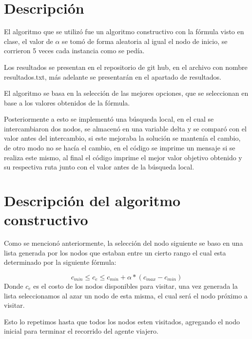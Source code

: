 \documentclass[12pt,a4paper]{article}
\begin{document}
\section{Descripción}
 El algoritmo que se utilizó fue un algoritmo constructivo con la fórmula visto en clase, el valor de $\alpha$ se tomó de forma aleatoria al igual el nodo de inicio, se corrieron 5 veces cada instancia como se pedía.
 
 Los resultados se presentan en el repositorio de git hub, en el archivo con nombre resultados.txt, más adelante se presentarán en el apartado de resultados.
 
 El algoritmo se basa en la selección de las mejores opciones, que se seleccionan en base a los valores obtenidos de la fórmula.

 Posteriormente a esto se implementó una búsqueda local, en el cual se intercambiaron dos nodos, se almacenó en una variable delta y se comparó con el valor antes del intercambio, si este mejoraba la solución se mantenía el cambio, de otro modo no se hacía el cambio, en el código
 se imprime un mensaje si se realiza este mismo, al final el código imprime el mejor valor objetivo obtenido y su respectiva ruta junto con el valor antes de la búsqueda local.
 
 \section{Descripción del algoritmo constructivo}

 Como se mencionó anteriormente, la selección del nodo siguiente se baso en una lista generada por los nodos que estaban entre un cierto rango el cual esta determinado por la siguiente fórmula:

 \[ c_{min} \leq c_e \leq c_{min} + \alpha * (c_{max} - c_{min}) \]
\newline
 Donde $c_e$ es el costo de los nodos disponibles para visitar, una vez generada la lista seleccionamos al azar un nodo de esta misma, el cual será el nodo próximo a visitar.

 Esto lo repetimos hasta que todos los nodos esten visitados, agregando el nodo inicial para terminar el recorrido del agente viajero.
\end{document}
